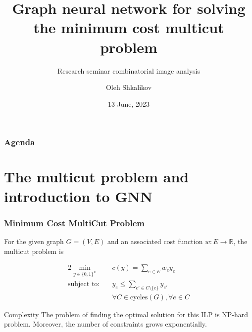 \documentclass{beamer}
\title[MultiCut GNN]{Graph neural network for solving the minimum cost multicut problem}
\subtitle{Research seminar combinatorial image analysis}
\author{Oleh Shkalikov}
\institute[TU Dresden]{TU Dresden, Computer Science Faculty}
\date{13 June, 2023}
\begin{document}
\frame{\titlepage}

\begin{frame}
    \frametitle{Agenda}
    \tableofcontents
\end{frame}

\section{The multicut problem and introduction to GNN}

\begin{frame}
    \frametitle{Minimum Cost MultiCut Problem}

    For the given graph $G = (V, E)$ and an associated cost
    function $w: E \to \mathbb{R}$, the multicut problem is

    \begin{alignat*}{2}
        \min_{y \in \{0, 1\}^E} \quad &
        c(y) = \sum\limits_{e \in E} w_e y_e                                            \\
        \text{subject to:}      \quad &
        y_e \leq \sum\limits_{e' \in C \setminus \{e\}} y_{e'}                          \\
                                      & \forall C \in \text{cycles}(G), \forall e \in C
    \end{alignat*}

    \begin{alertblock}{Complexity}
        The problem of finding the optimal solution for this ILP
        is NP-hard problem. Moreover, the number of constraints grows
        exponentially.
    \end{alertblock}

\end{frame}
\end{document}
